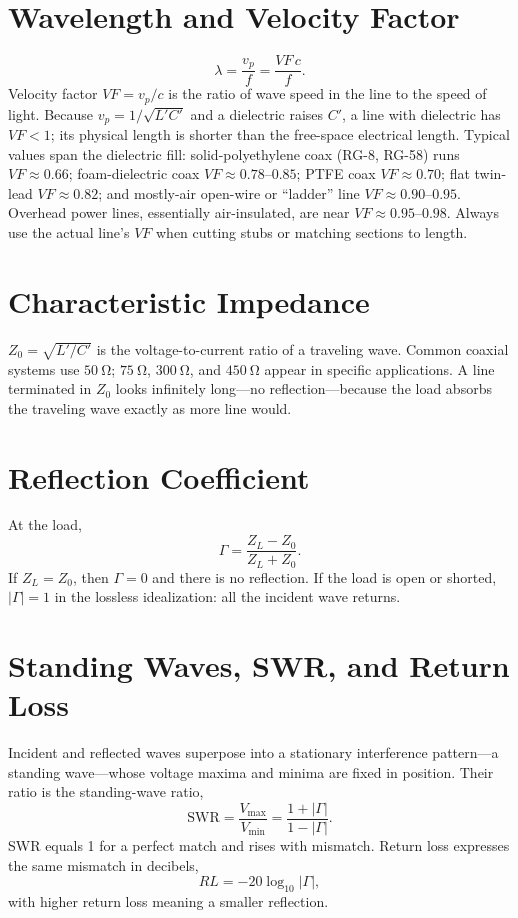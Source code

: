 \section{Wavelength and Velocity Factor}
\[
\lambda=\frac{v_p}{f}=\frac{VF\,c}{f}.
\]
Velocity factor \(VF=v_p/c\) is the ratio of wave speed in the line to the speed
of light. Because \(v_p=1/\sqrt{L'C'}\) and a dielectric raises \(C'\), a line
with dielectric has \(VF<1\); its physical length is shorter than the free-space
electrical length. Typical values span the dielectric fill: solid-polyethylene
coax (RG-8, RG-58) runs \(VF\approx0.66\); foam-dielectric coax
\(VF\approx0.78\text{--}0.85\); PTFE coax \(VF\approx0.70\); flat twin-lead
\(VF\approx0.82\); and mostly-air open-wire or ``ladder'' line
\(VF\approx0.90\text{--}0.95\). Overhead power lines, essentially air-insulated,
are near \(VF\approx0.95\text{--}0.98\). Always use the actual line's \(VF\) when
cutting stubs or matching sections to length.

\section{Characteristic Impedance}
\(Z_0=\sqrt{L'/C'}\) is the voltage-to-current ratio of a traveling wave. Common
coaxial systems use \(\SI{50}{\ohm}\); \(\SI{75}{\ohm}\), \(\SI{300}{\ohm}\), and
\(\SI{450}{\ohm}\) appear in specific applications. A line terminated in \(Z_0\)
looks infinitely long---no reflection---because the load absorbs the traveling
wave exactly as more line would.

\section{Reflection Coefficient}
At the load,
\[
\Gamma=\frac{Z_L-Z_0}{Z_L+Z_0}.
\]
If \(Z_L=Z_0\), then \(\Gamma=0\) and there is no reflection. If the load is open
or shorted, \(|\Gamma|=1\) in the lossless idealization: all the incident wave
returns.

\section{Standing Waves, SWR, and Return Loss}
Incident and reflected waves superpose into a stationary interference pattern---a
standing wave---whose voltage maxima and minima are fixed in position. Their ratio
is the standing-wave ratio,
\[
\mathrm{SWR}=\frac{V_{\max}}{V_{\min}}=\frac{1+|\Gamma|}{1-|\Gamma|}.
\]
SWR equals 1 for a perfect match and rises with mismatch. Return loss expresses
the same mismatch in decibels,
\[
RL=-20\log_{10}|\Gamma|,
\]
with higher return loss meaning a smaller reflection.

